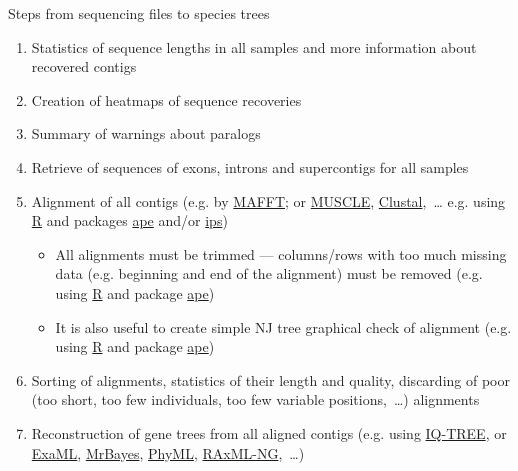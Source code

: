 \documentclass[compress,  xelatex, 11pt, xcolor=x11names, aspectratio=169,
	hyperref={
		bookmarks=true,
		unicode=true,
		colorlinks=true,
		pdftitle={HybSeq course},
		plainpages=false,
		pdfauthor={Vojtech Zeisek},
		pdfsubject={Practical processing of HybSeq target enrichment sequencing data on computing grids like MetaCentrum},
		pdfcreator={XeLaTeX},
		pdfkeywords={BASH, command line, GNU, HybSeq, Linux, MetaCentrum, sequencing shell, target enrichment},
		linkcolor=Turquoise4, %
		anchorcolor=DodgerBlue4, %
		citecolor=DodgerBlue4, %
		filecolor=DodgerBlue4, %
		menucolor=Tan4, %
		urlcolor=DarkOliveGreen4 %
		},
	url={hyphens, lowtilde} %
	]{beamer}
\begin{document}
\begin{frame}[allowframebreaks]{Steps from sequencing files to species trees}
\begin{enumerate}
\begin{enumerate}
\begin{itemize}
				\item All contigs that pass the previous steps are concatenated into a \enquote{supercontig} and the exonerate search is repeated
			\end{itemize}
			\item Search for paralogs --- if SPAdes assembler generates multiple contigs that contain coding sequences representing 75\% of the length of the reference protein, HybPiper will print a warning for that gene
			\item Recovering of the individual sequences
			\item Statistics of the recovery
			\item Cleanup of temporal files (especially SPAdes produces huge amount of data unneeded for further processing)
		\end{enumerate}
		\item Statistics of sequence lengths in all samples and more information about recovered contigs
		\item Creation of heatmaps of sequence recoveries
		\item Summary of warnings about paralogs
		\item Retrieve of sequences of exons, introns and supercontigs for all samples
		\item Alignment of all contigs (e.g. by \href{https://mafft.cbrc.jp/alignment/software/}{MAFFT}; or \href{https://www.drive5.com/muscle/}{MUSCLE}, \href{http://www.clustal.org/}{Clustal},~\ldots{ }e.g. using \href{https://www.r-project.org/}{R} and packages \href{https://cran.r-project.org/package=ape}{ape} and/or \href{https://cran.r-project.org/package=ips}{ips})
		\begin{itemize}
			\item All alignments must be trimmed --- columns/rows with too much missing data (e.g. beginning and end of the alignment) must be removed (e.g. using \href{https://www.r-project.org/}{R} and package \href{https://cran.r-project.org/package=ape}{ape})
			\item It is also useful to create simple NJ tree graphical check of alignment (e.g. using \href{https://www.r-project.org/}{R} and package \href{https://cran.r-project.org/package=ape}{ape})
		\end{itemize}
		\item Sorting of alignments, statistics of their length and quality, discarding of poor (too short, too few individuals, too few variable positions,~\ldots) alignments
		\item Reconstruction of gene trees from all aligned contigs (e.g. using \href{https://iqtree.github.io/}{IQ-TREE}, or \href{https://github.com/stamatak/ExaML}{ExaML}, \href{https://nbisweden.github.io/MrBayes/}{MrBayes}, \href{https://github.com/stephaneguindon/phyml}{PhyML}, \href{https://github.com/amkozlov/raxml-ng}{RAxML-NG},~\ldots)

\end{enumerate}
\end{frame}
\end{document}
